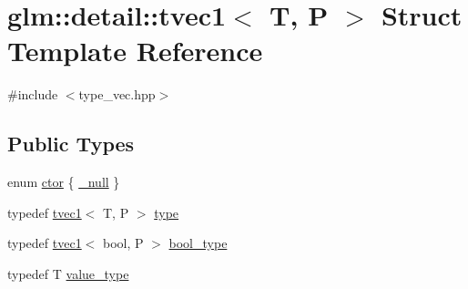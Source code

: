 \hypertarget{structglm_1_1detail_1_1tvec1}{}\section{glm\+:\+:detail\+:\+:tvec1$<$ T, P $>$ Struct Template Reference}
\label{structglm_1_1detail_1_1tvec1}


{\ttfamily \#include $<$type\+\_\+vec.\+hpp$>$}

\subsection*{Public Types}
\begin{DoxyCompactItemize}
\item 
enum \hyperlink{structglm_1_1detail_1_1tvec1_a33f1783ca537d8dad5624e5adcf6bd5a}{ctor} \{ \hyperlink{structglm_1_1detail_1_1tvec1_a33f1783ca537d8dad5624e5adcf6bd5aa7ce00dc90fccdedc1198d857fa60e844}{\+\_\+null}
 \}
\item 
typedef \hyperlink{structglm_1_1detail_1_1tvec1}{tvec1}$<$ T, P $>$ \hyperlink{structglm_1_1detail_1_1tvec1_aaf46d49a966e6d66f8f9c6beb5a33afe}{type}
\item 
typedef \hyperlink{structglm_1_1detail_1_1tvec1}{tvec1}$<$ bool, P $>$ \hyperlink{structglm_1_1detail_1_1tvec1_a9d5cbfb22c5b204382bede6efb1e96a2}{bool\+\_\+type}
\item 
typedef T \hyperlink{structglm_1_1detail_1_1tvec1_ac69856e6aa1e97517e1edabc836a9c1a}{value\+\_\+type}
\end{DoxyCompactItemize}
